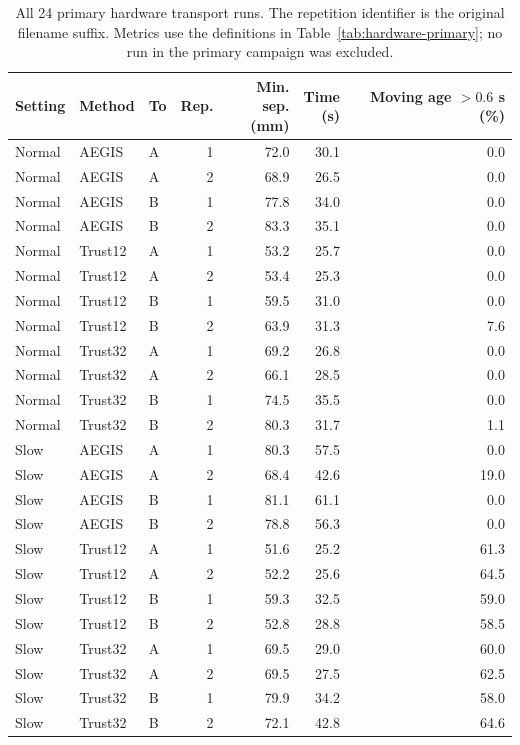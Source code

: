 \begin{table}[H]
\centering
\small
\caption{All 24 primary hardware transport runs. The repetition identifier is the original filename suffix. Metrics use the definitions in Table~\ref{tab:hardware-primary}; no run in the primary campaign was excluded.}
\label{tab:hardware-individual}
\begin{tabular}{lllrrrr}
\toprule
Setting & Method & To & Rep. & \shortstack{Min. sep.\\(mm)} & \shortstack{Time\\(s)} & \shortstack{Moving age $>0.6$ s\\(\%)} \\
\midrule
Normal & AEGIS & A & 1 & 72.0 & 30.1 & 0.0 \\
Normal & AEGIS & A & 2 & 68.9 & 26.5 & 0.0 \\
Normal & AEGIS & B & 1 & 77.8 & 34.0 & 0.0 \\
Normal & AEGIS & B & 2 & 83.3 & 35.1 & 0.0 \\
Normal & Trust12 & A & 1 & 53.2 & 25.7 & 0.0 \\
Normal & Trust12 & A & 2 & 53.4 & 25.3 & 0.0 \\
Normal & Trust12 & B & 1 & 59.5 & 31.0 & 0.0 \\
Normal & Trust12 & B & 2 & 63.9 & 31.3 & 7.6 \\
Normal & Trust32 & A & 1 & 69.2 & 26.8 & 0.0 \\
Normal & Trust32 & A & 2 & 66.1 & 28.5 & 0.0 \\
Normal & Trust32 & B & 1 & 74.5 & 35.5 & 0.0 \\
Normal & Trust32 & B & 2 & 80.3 & 31.7 & 1.1 \\
Slow & AEGIS & A & 1 & 80.3 & 57.5 & 0.0 \\
Slow & AEGIS & A & 2 & 68.4 & 42.6 & 19.0 \\
Slow & AEGIS & B & 1 & 81.1 & 61.1 & 0.0 \\
Slow & AEGIS & B & 2 & 78.8 & 56.3 & 0.0 \\
Slow & Trust12 & A & 1 & 51.6 & 25.2 & 61.3 \\
Slow & Trust12 & A & 2 & 52.2 & 25.6 & 64.5 \\
Slow & Trust12 & B & 1 & 59.3 & 32.5 & 59.0 \\
Slow & Trust12 & B & 2 & 52.8 & 28.8 & 58.5 \\
Slow & Trust32 & A & 1 & 69.5 & 29.0 & 60.0 \\
Slow & Trust32 & A & 2 & 69.5 & 27.5 & 62.5 \\
Slow & Trust32 & B & 1 & 79.9 & 34.2 & 58.0 \\
Slow & Trust32 & B & 2 & 72.1 & 42.8 & 64.6 \\
\bottomrule
\end{tabular}
\end{table}
